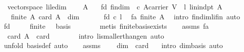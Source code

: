 \begin{isabellebody}
\isamarkuptrue%
\isamarkupfalse%
\ {\isacharparenleft}\ vectorspace{\isacharparenright}\ li{\isacharunderscore}le{\isacharunderscore}dim{\isacharcolon}\ \isanewline
\ \ \ A\isanewline
\ \ \ fd{\isacharcolon}\ {\isachardoublequoteopen}fin{\isacharunderscore}dim{\isachardoublequoteclose}\ \ c{\isacharcolon}\ {\isachardoublequoteopen}A{\isasymsubseteq}carrier\ V{\isachardoublequoteclose}\ \ l{\isacharcolon}\ {\isachardoublequoteopen}lin{\isacharunderscore}indpt\ A{\isachardoublequoteclose}\isanewline
\ \ \ {\isachardoublequoteopen}finite\ A{\isachardoublequoteclose}\ {\isachardoublequoteopen}card\ A\ {\isasymle}\ dim{\isachardoublequoteclose}\isanewline
%
\isadelimproof
%
\endisadelimproof
%
\isatagproof
{}\isamarkupfalse%
\ \ {\isacharminus}\isanewline
\ \ \isamarkupfalse%
\ fd\ c\ l\ \isamarkupfalse%
\ fa{\isacharcolon}\ {\isachardoublequoteopen}finite\ A{\isachardoublequoteclose}\ \isamarkupfalse%
\ {\isacharparenleft}intro\ fin{\isacharunderscore}dim{\isacharunderscore}li{\isacharunderscore}fin{\isacharcomma}\ auto{\isacharparenright}\isanewline
\ \ \isamarkupfalse%
\ fd\ \isamarkupfalse%
\ {\isasymbeta}\ \ {}{\isacharcolon}\ {\isachardoublequoteopen}finite\ {\isasymbeta}\ {\isasymand}\ basis\ {\isasymbeta}{\isachardoublequoteclose}\ \isanewline
\ \ \ \ \isamarkupfalse%
\ {\isacharparenleft}metis\ finite{\isacharunderscore}basis{\isacharunderscore}exists{\isacharparenright}\isanewline
\ \ \isamarkupfalse%
\ assms\ fa\ {}\ \isamarkupfalse%
\ {}{\isacharcolon}\ {\isachardoublequoteopen}card\ A\ {\isasymle}\ card\ {\isasymbeta}{\isachardoublequoteclose}\ \isanewline
\ \ \ \ \isamarkupfalse%
\ {\isacharparenleft}intro\ li{\isacharunderscore}smaller{\isacharunderscore}than{\isacharunderscore}gen{\isacharcomma}\ auto{\isacharparenright}\ \isanewline
\ \ \ \ \ \ \isamarkupfalse%
\ {\isacharparenleft}unfold\ basis{\isacharunderscore}def{\isacharcomma}\ auto{\isacharparenright}\isanewline
\ \ \isamarkupfalse%
\ assms\ {}\ \isamarkupfalse%
\ {}{\isacharcolon}\ {\isachardoublequoteopen}dim\ {\isacharequal}\ card\ {\isasymbeta}{\isachardoublequoteclose}\ \isamarkupfalse%
\ {\isacharparenleft}intro\ dim{\isacharunderscore}basis{\isacharcomma}\ auto{\isacharparenright}\isanewline

\end{isabellebody}
